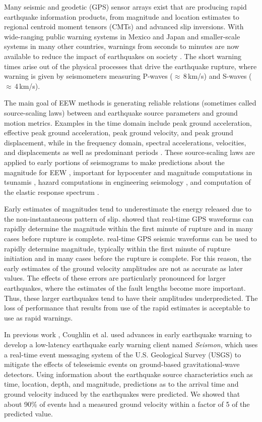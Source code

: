 \documentclass[preprint, aps, showpacs]{revtex4-1}
\begin{document}
Many seismic and geodetic (GPS) sensor arrays exist that are producing rapid earthquake information products, from magnitude and location estimates to regional centroid moment tensors (CMTs) and advanced slip inversions.
With wide-ranging public warning systems in Mexico and Japan and smaller-scale systems in many other countries, warnings from seconds to minutes are now available to reduce the impact of earthquakes on society \cite{StAl2016}.
The short warning times arise out of the physical processes that drive the earthquake rupture, where warning is given by seismometers measuring P-waves ($\approx$\,8\,km/s) and S-waves ($\approx$\,4\,km/s).

The main goal of EEW methods is generating reliable relations (sometimes called source-scaling laws) between and earthquake source parameters and ground motion metrics. Examples in the time domain include peak ground acceleration, effective peak ground acceleration, peak ground velocity, and peak
ground displacement, while in the frequency domain, spectral accelerations, velocities, and displacements as well as predominant periods \cite{Do2003}. These source-scaling laws are applied to early portions of seismograms to make predictions about the magnitude for EEW \cite{AlGa2009}, important for hypocenter and magnitude computations in tsunamis \cite{MeCr2015}, hazard computations in engineering seismology \cite{PaMu2012}, and computation of the elastic response spectrum \cite{Ch2007}.

Early estimates of magnitudes tend to underestimate the energy released due to the non-instantaneous pattern of slip.
\cite{MeCr2015} showed that real-time GPS waveforms can rapidly determine the magnitude within the first minute of rupture and in many cases before rupture is complete.
real-time GPS seismic waveforms can be used to rapidly determine magnitude, typically within the first minute of rupture initiation and in many cases before the rupture is complete. 
For this reason, the early estimates of the ground velocity amplitudes are not as accurate as later values. 
The effects of these errors are particularly pronounced for larger earthquakes, where the estimates of the fault lengths become more important.
Thus, these larger earthquakes tend to have their amplitudes underpredicted.
The loss of performance that results from use of the rapid estimates is acceptable to use as rapid warnings.

In previous work \cite{CoEa2017}, Coughlin et al. used advances in early earthquake warning to develop a low-latency earthquake early warning client named \emph{Seismon}, which uses a real-time event messaging system of the U.S. Geological Survey (USGS) to mitigate the effects of teleseismic events on ground-based gravitational-wave detectors. 
Using information about the earthquake source characteristics such as time, location, depth, and magnitude, predictions as to the arrival time and ground velocity induced by the earthquakes were predicted.
We showed that about 90\% of events had a measured ground velocity within a factor of 5 of the predicted value.
\end{document}
